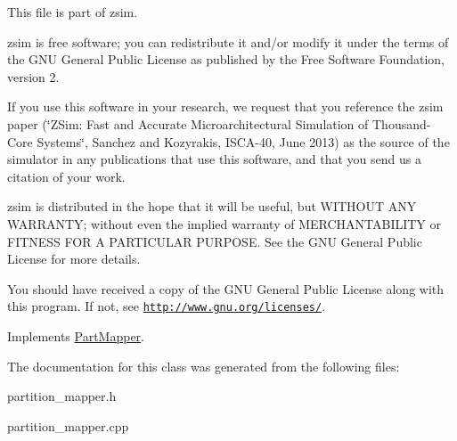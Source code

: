 This file is part of zsim.

zsim is free software; you can redistribute it and/or modify it under the terms of the G\-N\-U General Public License as published by the Free Software Foundation, version 2.

If you use this software in your research, we request that you reference the zsim paper (\char`\"{}\-Z\-Sim\-: Fast and Accurate Microarchitectural Simulation of
\-Thousand-\/\-Core Systems\char`\"{}, Sanchez and Kozyrakis, I\-S\-C\-A-\/40, June 2013) as the source of the simulator in any publications that use this software, and that you send us a citation of your work.

zsim is distributed in the hope that it will be useful, but W\-I\-T\-H\-O\-U\-T A\-N\-Y W\-A\-R\-R\-A\-N\-T\-Y; without even the implied warranty of M\-E\-R\-C\-H\-A\-N\-T\-A\-B\-I\-L\-I\-T\-Y or F\-I\-T\-N\-E\-S\-S F\-O\-R A P\-A\-R\-T\-I\-C\-U\-L\-A\-R P\-U\-R\-P\-O\-S\-E. See the G\-N\-U General Public License for more details.

You should have received a copy of the G\-N\-U General Public License along with this program. If not, see \href{http://www.gnu.org/licenses/}{\tt http\-://www.\-gnu.\-org/licenses/}. 

Implements \hyperlink{classPartMapper}{Part\-Mapper}.



The documentation for this class was generated from the following files\-:\begin{DoxyCompactItemize}
\item 
partition\-\_\-mapper.\-h\item 
partition\-\_\-mapper.\-cpp\end{DoxyCompactItemize}
